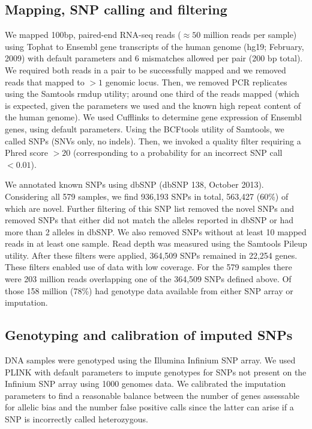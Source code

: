 \documentclass[letterpaper]{article}
\begin{document}
\subsection*{Mapping, SNP calling and filtering}

We mapped 100bp, paired-end RNA-seq reads (\(\approx50\) million reads per sample) using Tophat
to Ensembl gene transcripts of the human genome (hg19; February, 2009) with
default parameters and 6 mismatches allowed per pair (200 bp total). We
required both reads in a pair to be successfully mapped and we removed reads
that mapped to \(>1\) genomic locus. Then, we removed PCR replicates using the
Samtools rmdup utility; around one third of the reads mapped (which is
expected, given the parameters we used and the known high repeat content of
the human genome). We used Cufflinks to determine gene expression of Ensembl
genes, using default parameters. Using the BCFtools utility of Samtools, we
called SNPs (SNVs only, no indels). Then, we invoked a quality filter
requiring a Phred score \(>20\) (corresponding to a probability for an
incorrect SNP call \(<0.01\)).

We annotated known SNPs using dbSNP (dbSNP 138, October 2013). Considering all
579 samples, we find 936,193 SNPs in total, 563,427 (60\%) of which are novel.
Further filtering of this SNP list removed the novel SNPs and removed SNPs
that either did not match the alleles reported in dbSNP or had more than 2
alleles in dbSNP. We also removed SNPs without at least 10 mapped reads in at
least one sample. Read depth was measured using the Samtools Pileup utility.
After these filters were applied, 364,509 SNPs remained in 22,254 genes. These
filters enabled use of data with low coverage.  For the 579
samples there were 203 million reads overlapping one of the
364,509 SNPs defined above.  Of those 158 million (78\%) had genotype data
available from either SNP array or imputation.

\subsection*{Genotyping and calibration of imputed SNPs}

DNA samples were genotyped using the Illumina Infinium SNP array. We used
PLINK with default parameters to impute genotypes for SNPs not present on the
Infinium SNP array using 1000 genomes data.  We calibrated the
imputation parameters to find a reasonable balance between the number of genes
assessable for allelic bias and the number false positive
calls since the latter can arise if a SNP is
incorrectly called heterozygous.
\end{document}

